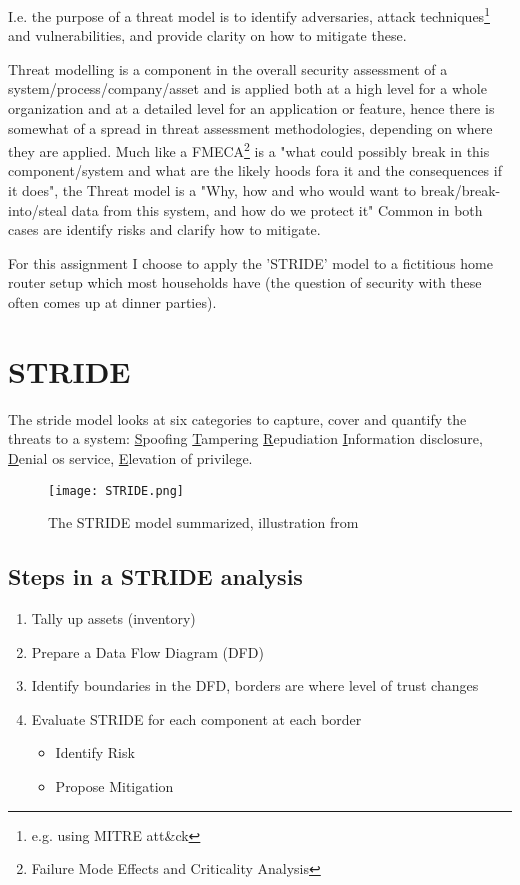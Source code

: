 \documentclass[
	letterpaper, %
	10pt, %
	unnumberedsections, %
	twoside, %
]{APAAssignment}
\begin{document}
I.e. the purpose of a threat model is to identify adversaries, attack techniques\footnote{e.g. using MITRE att\&ck} and vulnerabilities, and provide clarity on how to mitigate these.   

Threat modelling is a component in the overall security assessment of a system/process/company/asset and is applied both at a high level for a whole organization and at a detailed level for an application or feature, hence there is somewhat of a spread in threat assessment methodologies\cite{12Methods}, depending on where they are applied. Much like a FMECA\footnote{Failure Mode Effects and Criticality Analysis} is a "what could possibly break in this component/system and what are the likely hoods fora it and the consequences if it does", the Threat model is a "Why, how and who would want to break/break-into/steal data from this system, and how do we protect it" Common in both cases are identify risks and clarify how to mitigate.

For this assignment I choose to apply the 'STRIDE' model to a fictitious home router setup which most households have (the question of security with these often comes up at dinner parties).

\section{STRIDE}

The stride model looks at six categories to capture, cover and quantify the threats to a system: \underline{S}poofing \underline{T}ampering \underline{R}epudiation \underline{I}nformation disclosure, \underline{D}enial os service, \underline{E}levation of privilege. 



\begin{figure}[!htp] %
	\centering
	\texttt{[image: STRIDE.png]}
	\caption{The STRIDE model summarized, illustration from \cite{STRIDE_For_pay_Medium}}
	\label{fig:STRIDE}
\end{figure}

\subsection{Steps in a STRIDE analysis}

\begin{enumerate}
	\item Tally up assets (inventory)
	\item Prepare a Data Flow Diagram (DFD)
	\item Identify boundaries in the DFD, borders are where level of trust changes
	\item Evaluate STRIDE for each component at each border
	\begin{itemize}
		\item Identify Risk 
		\item Propose Mitigation
	\end{itemize} 
\end{enumerate}
\end{document}
